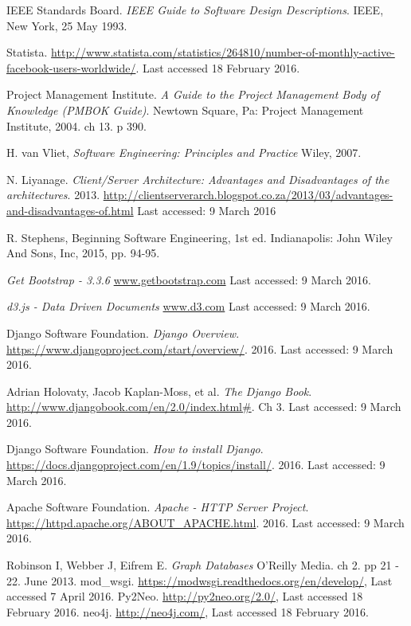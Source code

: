 \documentclass[12pt,onecolumn]{article}
\begin{document}
	\begin{thebibliography}{1}
		 IEEE Standards Board. \emph{IEEE Guide to Software Design Descriptions}. IEEE, New York, 25 May 1993.
		
		 Statista. \url {http://www.statista.com/statistics/264810/number-of-monthly-active-facebook-users-worldwide/}. Last accessed 18 February 2016. 
		
		 Project Management Institute. \emph{A Guide to the Project Management Body of Knowledge (PMBOK Guide)}. Newtown Square, Pa: Project Management Institute, 2004. ch 13. p 390.
		
		 H. van Vliet, \emph{Software Engineering: Principles and Practice} Wiley, 2007.
		
		 N. Liyanage. \emph{Client/Server Architecture: Advantages and Disadvantages of the architectures}. 2013. \url{http://clientserverarch.blogspot.co.za/2013/03/advantages-and-disadvantages-of.html} Last accessed: 9 March 2016
		
		 R. Stephens, Beginning Software Engineering, 1st ed. Indianapolis: John Wiley And Sons, Inc, 2015, pp. 94-95.
		
		  \emph{Get Bootstrap - 3.3.6} \url{www.getbootstrap.com} Last accessed: 9 March 2016.
		
		  \emph{d3.js - Data Driven Documents} \url{www.d3.com} Last accessed: 9 March 2016.
		
		 Django Software Foundation. \emph{Django Overview}. \url{https://www.djangoproject.com/start/overview/}. 2016. Last accessed: 9 March 2016. 
		
		 Adrian Holovaty, Jacob Kaplan-Moss, et al. \emph{The Django Book}. \url{http://www.djangobook.com/en/2.0/index.html#}. Ch 3. Last accessed: 9 March 2016.
		
		 Django Software Foundation. \emph{How to install Django}. \url{https://docs.djangoproject.com/en/1.9/topics/install/}. 2016. Last accessed: 9 March 2016.	
		
		 Apache Software Foundation. \emph{Apache - HTTP Server Project}. \url{https://httpd.apache.org/ABOUT_APACHE.html}. 2016. Last accessed: 9 March 2016.	
		
		 Robinson I, Webber J, Eifrem E. \emph{Graph Databases} O'Reilly Media. ch 2. pp 21 - 22. June 2013.
		 mod\_wsgi. \url{https://modwsgi.readthedocs.org/en/develop/}, Last accessed 7 April 2016.
		 Py2Neo. \url{http://py2neo.org/2.0/}, Last accessed 18 February 2016.
		 neo4j. \url{http://neo4j.com/}, Last accessed 18 February 2016.
		

\end{thebibliography}
\end{document}
